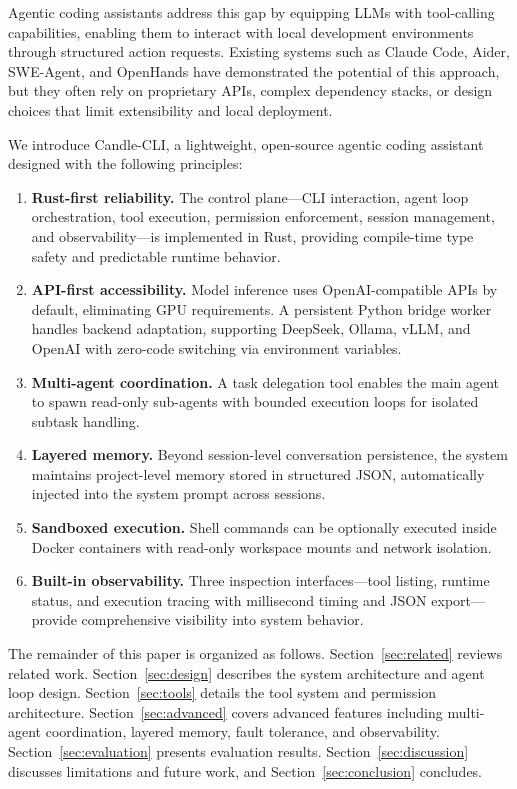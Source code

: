 \documentclass[11pt]{article}
\begin{document}
Agentic coding assistants address this gap by equipping LLMs with tool-calling capabilities, enabling them to interact with local development environments through structured action requests. Existing systems such as Claude Code, Aider, SWE-Agent, and OpenHands have demonstrated the potential of this approach, but they often rely on proprietary APIs, complex dependency stacks, or design choices that limit extensibility and local deployment.

We introduce Candle-CLI, a lightweight, open-source agentic coding assistant designed with the following principles:

\begin{enumerate}[leftmargin=*]
    \item \textbf{Rust-first reliability.} The control plane---CLI interaction, agent loop orchestration, tool execution, permission enforcement, session management, and observability---is implemented in Rust, providing compile-time type safety and predictable runtime behavior.
    \item \textbf{API-first accessibility.} Model inference uses OpenAI-compatible APIs by default, eliminating GPU requirements. A persistent Python bridge worker handles backend adaptation, supporting DeepSeek, Ollama, vLLM, and OpenAI with zero-code switching via environment variables.
    \item \textbf{Multi-agent coordination.} A task delegation tool enables the main agent to spawn read-only sub-agents with bounded execution loops for isolated subtask handling.
    \item \textbf{Layered memory.} Beyond session-level conversation persistence, the system maintains project-level memory stored in structured JSON, automatically injected into the system prompt across sessions.
    \item \textbf{Sandboxed execution.} Shell commands can be optionally executed inside Docker containers with read-only workspace mounts and network isolation.
    \item \textbf{Built-in observability.} Three inspection interfaces---tool listing, runtime status, and execution tracing with millisecond timing and JSON export---provide comprehensive visibility into system behavior.
\end{enumerate}

The remainder of this paper is organized as follows. Section~\ref{sec:related} reviews related work. Section~\ref{sec:design} describes the system architecture and agent loop design. Section~\ref{sec:tools} details the tool system and permission architecture. Section~\ref{sec:advanced} covers advanced features including multi-agent coordination, layered memory, fault tolerance, and observability. Section~\ref{sec:evaluation} presents evaluation results. Section~\ref{sec:discussion} discusses limitations and future work, and Section~\ref{sec:conclusion} concludes.
\end{document}
